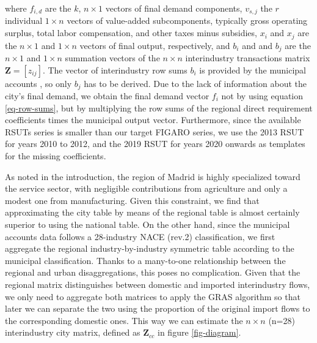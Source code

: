 \documentclass[
  10pt,
  twocolumn]{aft}
\begin{document}
where \(f_{i,d}\) are the \(k\), \(n \times 1\) vectors of final demand
components, \(v_{s,j}\) the \(r\) individual \(1 \times n\) vectors of
value-added subcomponents, typically gross operating surplus, total
labor compensation, and other taxes minus subsidies, \(x_i\) and \(x_j\)
are the \(n \times 1\) and \(1 \times n\) vectors of final output,
respectively, and \(b_i\) and and \(b_j\) are the \(n \times 1\) and
\(1 \times n\) summation vectors of the \(n \times n\) interindustry
transactions matrix \(\textbf{Z}=[z_{ij}]\). The vector of interindustry
row sums \(b_i\) is provided by the municipal accounts
\citep{am_areas_2023}, so only \(b_j\) has to be derived. Due to the
lack of information about the city's final demand, we obtain the final
demand vector \(f_i\) not by using equation \ref{eq-row-sums}, but by
multiplying the row sums of the regional direct requirement coefficients
times the municipal output vector. Furthermore, since the available
RSUTs series is smaller than our target FIGARO series, we use the 2013
RSUT for years 2010 to 2012, and the 2019 RSUT for years 2020 onwards as
templates for the missing coefficients.

As noted in the introduction, the region of Madrid is highly specialized
toward the service sector, with negligible contributions from
agriculture and only a modest one from manufacturing. Given this
constraint, we find that approximating the city table by means of the
regional table is almost certainly superior to using the national table.
On the other hand, since the municipal accounts data follows a
28-industry NACE (rev.2) classification, we first aggregate the regional
industry-by-industry symmetric table according to the municipal
classification. Thanks to a many-to-one relationship between the
regional and urban disaggregations, this poses no complication. Given
that the regional matrix distinguishes between domestic and imported
interindustry flows, we only need to aggregate both matrices to apply
the GRAS algorithm so that later we can separate the two using the
proportion of the original import flows to the corresponding domestic
ones. This way we can estimate the \(n \times n\) (n=28) interindustry
city matrix, defined as \(\textbf{Z}_{cc}\) in figure \ref{fig-diagram}.
\end{document}
